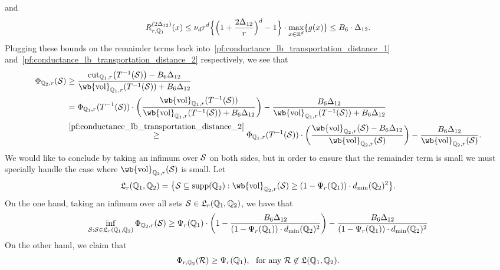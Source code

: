 	and
	\begin{equation*}
	R_{r,\mathbb{Q}_1}^{(2\Delta_{12})}(x) \leq \nu_dr^d\Bigl\{\Bigl(1 + \frac{2\Delta_{12}}{r}\Bigr)^d - 1\Bigr\} \cdot \max_{x \in \mathbb{R}^d}\{g(x)\} \leq B_6 \cdot \Delta_{12}.
	\end{equation*} 
	Plugging these bounds on the remainder terms back into~\eqref{pf:conductance_lb_transportation_distance_1} and~\eqref{pf:conductance_lb_transportation_distance_2} respectively, we see that
	\begin{align*}
	\Phi_{\mbb{Q}_2,r}(\mc{S}) & \geq \frac{\cut_{\mbb{Q}_1,r}\bigl(T^{-1}(\mc{S})\bigr) - B_6 \Delta_{12}}{\wb{\vol}_{\mbb{Q}_1,r}(T^{-1}(\mc{S})) + B_6 \Delta_{12}} \\ & = \Phi_{\mbb{Q}_1,r}(T^{-1}(\mc{S})) \cdot \biggl(\frac{\wb{\vol}_{\mbb{Q}_1,r}(T^{-1}(\mc{S}))}{\wb{\vol}_{\mbb{Q}_1,r}(T^{-1}(\mc{S})) + B_6\Delta_{12}}\biggr) - \frac{B_6\Delta_{12}}{\wb{\vol}_{\mbb{Q}_1,r}(T^{-1}(\mc{S})) + B_6\Delta_{12}} \\
	& \overset{\eqref{pf:conductance_lb_transportation_distance_2}}{\geq} \Phi_{\mbb{Q}_1,r}(T^{-1}(\mc{S})) \cdot \biggl(\frac{\wb{\vol}_{\mbb{Q}_2,r}(\mc{S}) - B_6\Delta_{12}}{\wb{\vol}_{\mbb{Q}_2,r}(\mc{S})}\biggr) - \frac{B_6\Delta_{12}}{\wb{\vol}_{\mbb{Q}_2,r}(\mc{S})}.
	\end{align*}
	We would like to conclude by taking an infimum over $\mathcal{S}$ on both sides, but in order to ensure that the remainder term is small we must specially handle the case where $\wb{\vol}_{\mbb{Q}_2,r}(\mc{S})$ is small. Let
	\begin{equation*}
	\mathfrak{L}_{r}(\mbb{Q}_1,\mbb{Q}_2) = \bigl\{\mc{S} \subseteq \mathrm{supp}(\mbb{Q}_2): \wb{\vol}_{\mbb{Q}_2,r}(\mc{S}) \geq (1 - \Psi_r(\mbb{Q}_1)) \cdot d_{\min}(\mbb{Q}_2)^2 \bigr\}.
	\end{equation*}
	On the one hand, taking an infimum over all sets $\mathcal{S} \in \mathfrak{L}_{r}(\mathbb{Q}_1,\mathbb{Q}_2)$, we have that
	\begin{equation*}
	\inf_{\mathcal{S}: \mathcal{S} \in \mathfrak{L}_{r}(\mathbb{Q}_1,\mathbb{Q}_2)} \Phi_{\mathbb{Q}_2,r}(\mathcal{S}) \geq \Psi_{r}(\mathbb{Q}_1) \cdot \biggl(1 - \frac{B_6 \Delta_{12}}{(1 - \Psi_r(\mathbb{Q}_1)) \cdot d_{\min}(\mathbb{Q}_2)^2}\biggr) - \frac{B_6\Delta_{12}}{(1 - \Psi_r(\mathbb{Q}_1)) \cdot d_{\min}(\mathbb{Q}_2)^2}
	\end{equation*}
	On the other hand, we claim that 
	\begin{equation}
	\label{pf:conductance_lb_transportation_distance_3}
	\Phi_{r,\mathbb{Q}_2}(\mathcal{R}) \geq \Psi_{r}(\mathbb{Q}_1),~~\textrm{for any $\mathcal{R} \not\in \mathfrak{L}(\mathbb{Q}_1,\mathbb{Q}_2)$}.
	\end{equation}
